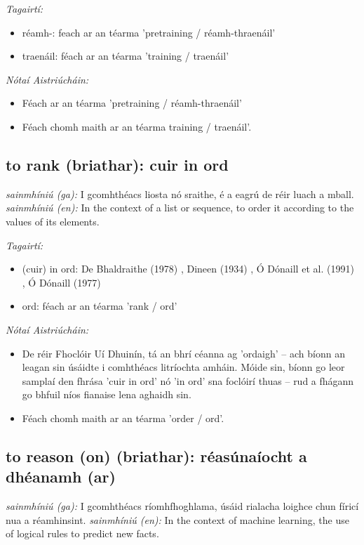 \documentclass{article}
\begin{document}
 \noindent \textit{Tagairtí:}
\begin{itemize}
	\item réamh-: feach ar an téarma 'pretraining / réamh-thraenáil'
	\item traenáil: féach ar an téarma 'training / traenáil'
\end{itemize}

 \noindent \textit{Nótaí Aistriúcháin:}
\begin{itemize}
	\item Féach ar an téarma 'pretraining / réamh-thraenáil'
	\item Féach chomh maith ar an téarma training / traenáil'.
\end{itemize}


\subsection*{to rank (briathar): cuir in ord} 
 \noindent \textit{sainmhíniú (ga):} I gcomhthéacs liosta nó sraithe, é a eagrú de réir luach a mball.
\newline\newline
 \noindent \textit{sainmhíniú (en):} In the context of a list or sequence, to order it according to the values of its elements.
\newline

 \noindent \textit{Tagairtí:}
\begin{itemize}
	\item (cuir) in ord: De Bhaldraithe (1978) \cite{de-bhaldraithe}, Dineen (1934) \cite{dineen}, Ó Dónaill et al. (1991) \cite{focloir-beag}, Ó Dónaill (1977) \cite{odonaill}
	\item ord: féach ar an téarma 'rank / ord'
\end{itemize}

 \noindent \textit{Nótaí Aistriúcháin:}
\begin{itemize}
	\item De réir Fhoclóir Uí Dhuinín, tá an bhrí céanna ag 'ordaigh' -- ach bíonn an leagan sin úsáidte i comhthéacs litríochta amháin. Móide sin, bíonn go leor samplaí den fhrása 'cuir in ord' nó 'in ord' sna foclóirí thuas -- rud a fhágann go bhfuil níos fianaise lena aghaidh sin.
	\item Féach chomh maith ar an téarma 'order / ord'.
\end{itemize}


\subsection*{to reason (on) (briathar): réasúnaíocht a dhéanamh (ar)} 
 \noindent \textit{sainmhíniú (ga):} I gcomhthéacs ríomhfhoghlama, úsáid rialacha loighce chun fíricí nua a réamhinsint.
\newline\newline
 \noindent \textit{sainmhíniú (en):} In the context of machine learning, the use of logical rules to predict new facts.
\newline
\end{document}
